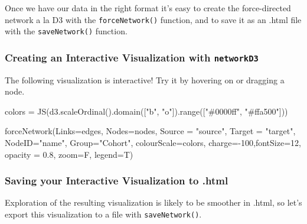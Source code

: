 \documentclass[
]{article}
\newenvironment{Shaded}{\begin{snugshade}}{\end{snugshade}}
\newcommand{\AttributeTok}[1]{\textcolor[rgb]{0.77,0.63,0.00}{#1}}
\newcommand{\DecValTok}[1]{\textcolor[rgb]{0.00,0.00,0.81}{#1}}
\newcommand{\FloatTok}[1]{\textcolor[rgb]{0.00,0.00,0.81}{#1}}
\newcommand{\FunctionTok}[1]{\textcolor[rgb]{0.00,0.00,0.00}{#1}}
\newcommand{\NormalTok}[1]{#1}
\newcommand{\OtherTok}[1]{\textcolor[rgb]{0.56,0.35,0.01}{#1}}
\newcommand{\SpecialCharTok}[1]{\textcolor[rgb]{0.00,0.00,0.00}{#1}}
\newcommand{\StringTok}[1]{\textcolor[rgb]{0.31,0.60,0.02}{#1}}
\theoremstyle{definition}
\theoremstyle{definition}
\theoremstyle{definition}
\theoremstyle{definition}
\theoremstyle{remark}
\begin{document}
Once we have our data in the right format it's easy to create the force-directed network a la D3 with the \texttt{forceNetwork()} function, and to save it as an .html file with the \texttt{saveNetwork()} function.

\hypertarget{creating-an-interactive-visualization-with-networkd3}{%
\subsubsection{\texorpdfstring{Creating an Interactive Visualization with \texttt{networkD3}}{Creating an Interactive Visualization with networkD3}}\label{creating-an-interactive-visualization-with-networkd3}}

The following visualization is interactive! Try it by hovering on or dragging a node.

\begin{Shaded}
\begin{Highlighting}[]
\NormalTok{colors }\OtherTok{=} \FunctionTok{JS}\NormalTok{(}\StringTok{\textquotesingle{}d3.scaleOrdinal().domain(["b", "o"]).range(["\#0000ff", "\#ffa500"])\textquotesingle{}}\NormalTok{)}

\FunctionTok{forceNetwork}\NormalTok{(}\AttributeTok{Links=}\NormalTok{edges, }\AttributeTok{Nodes=}\NormalTok{nodes, }\AttributeTok{Source =} \StringTok{"source"}\NormalTok{,}
             \AttributeTok{Target =} \StringTok{"target"}\NormalTok{, }\AttributeTok{NodeID=}\StringTok{"name"}\NormalTok{, }\AttributeTok{Group=}\StringTok{"Cohort"}\NormalTok{, }\AttributeTok{colourScale=}\NormalTok{colors,}
             \AttributeTok{charge=}\SpecialCharTok{{-}}\DecValTok{100}\NormalTok{,}\AttributeTok{fontSize=}\DecValTok{12}\NormalTok{, }\AttributeTok{opacity =} \FloatTok{0.8}\NormalTok{, }\AttributeTok{zoom=}\NormalTok{F, }\AttributeTok{legend=}\NormalTok{T)}
\end{Highlighting}
\end{Shaded}

\hypertarget{htmlwidget-b469c0b11add698c7dff}{}

\hypertarget{saving-your-interactive-visualization-to-.html}{%
\subsubsection{Saving your Interactive Visualization to .html}\label{saving-your-interactive-visualization-to-.html}}

Exploration of the resulting visualization is likely to be smoother in .html, so let's export this visualization to a file with \texttt{saveNetwork()}.
\end{document}
